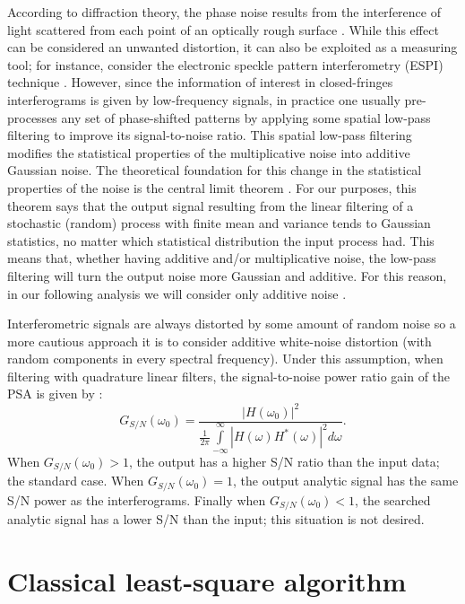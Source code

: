 According to diffraction theory, the phase noise results from the
interference of light scattered from each point of an optically rough surface 
\cite{Gasvik:2002}. While this effect can be considered an unwanted distortion, 
it can also be exploited as a measuring tool; for instance, consider the 
electronic speckle pattern interferometry (ESPI) technique \cite{Gasvik:2002}.
However, since the information of interest in closed-fringes interferograms is 
given by low-frequency signals, in
practice one usually pre-processes any set of phase-shifted patterns by applying
some spatial low-pass filtering to improve its signal-to-noise ratio. This spatial
low-pass filtering modifies the statistical properties of the multiplicative noise
into additive Gaussian noise. The theoretical foundation for this change in the
statistical properties of the noise is the central limit theorem 
\cite{Papoulis:2002}. For our
purposes, this theorem says that the output signal resulting from the linear
filtering of a stochastic (random) process with finite mean and variance tends
to Gaussian statistics, no matter which statistical distribution the input process
had. This means that, whether having additive and/or multiplicative noise, the
low-pass filtering will turn the output noise more Gaussian and additive. For
this reason, in our following analysis we will consider only additive noise
\cite{Servin:11,Surrel:97}.

Interferometric signals are always distorted by some amount of random
noise so a more cautious approach it is to consider additive white-noise 
distortion (with random components in every spectral frequency). Under this 
assumption, when filtering with quadrature linear filters, the signal-to-noise 
power ratio gain of the PSA is given by \cite{Servin:09}:
\begin{equation}
 G_{S/N}(\omega_0)=\frac{|H(\omega_0)|^2}{\frac{1}{2\pi}\int\limits_{-\infty}
^{\infty} |H(\omega)H^*(\omega)|^2 d\omega}.
\end{equation}
When $G_{S/N}(\omega_0)>1$, the output has a higher S/N ratio than the input data;
the standard case. When $G_{S/N}(\omega_0)=1$, the output analytic signal has 
the same S/N power as the interferograms. Finally when $G_{S/N}(\omega_0)<1$, the 
searched analytic signal has a lower S/N than the input; this situation is not 
desired.

\section{Classical least-square algorithm}

